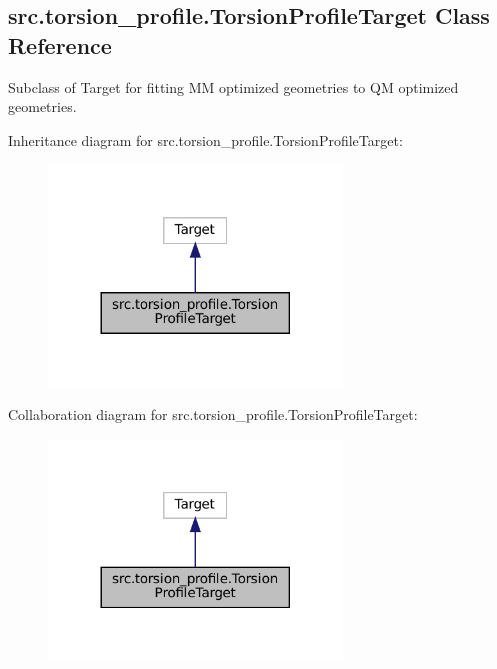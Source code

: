 \hypertarget{classsrc_1_1torsion__profile_1_1TorsionProfileTarget}{}\subsection{src.\+torsion\+\_\+profile.\+Torsion\+Profile\+Target Class Reference}
\label{classsrc_1_1torsion__profile_1_1TorsionProfileTarget}


Subclass of Target for fitting MM optimized geometries to QM optimized geometries.  




Inheritance diagram for src.\+torsion\+\_\+profile.\+Torsion\+Profile\+Target\+:
\nopagebreak
\begin{figure}[H]
\begin{center}
\leavevmode
\includegraphics[width=221pt]{classsrc_1_1torsion__profile_1_1TorsionProfileTarget__inherit__graph}
\end{center}
\end{figure}


Collaboration diagram for src.\+torsion\+\_\+profile.\+Torsion\+Profile\+Target\+:
\nopagebreak
\begin{figure}[H]
\begin{center}
\leavevmode
\includegraphics[width=221pt]{classsrc_1_1torsion__profile_1_1TorsionProfileTarget__coll__graph}
\end{center}
\end{figure}
